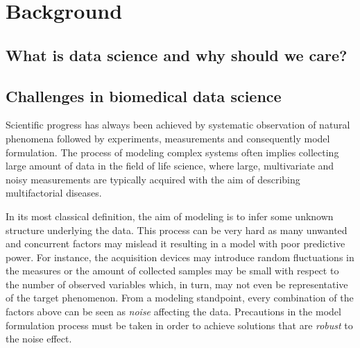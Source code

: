 \chapter{Background} \label{chap:background}


\section{What is data science and why should we care?}

\section{Challenges in biomedical data science}
Scientific progress has always been achieved by systematic observation of natural phenomena followed by experiments, measurements and consequently model formulation.
The process of modeling complex systems often implies collecting large amount of data in the field of life science, where large, multivariate and noisy measurements are typically acquired with the aim of describing multifactorial diseases.

In its most classical definition, the aim of modeling is to infer some unknown structure underlying the data. This process can be very hard as many unwanted and concurrent factors may mislead it resulting in a model with poor predictive power.  For instance, the acquisition devices may introduce random fluctuations in the measures or the amount of collected samples may be small with respect to the number of observed variables which, in turn, may not even be representative of the target phenomenon. From a modeling standpoint, every combination of the factors above can be seen as \textit{noise} affecting the data.
Precautions in the model formulation process must be taken in order to achieve solutions that are \textit{robust} to the noise effect.

